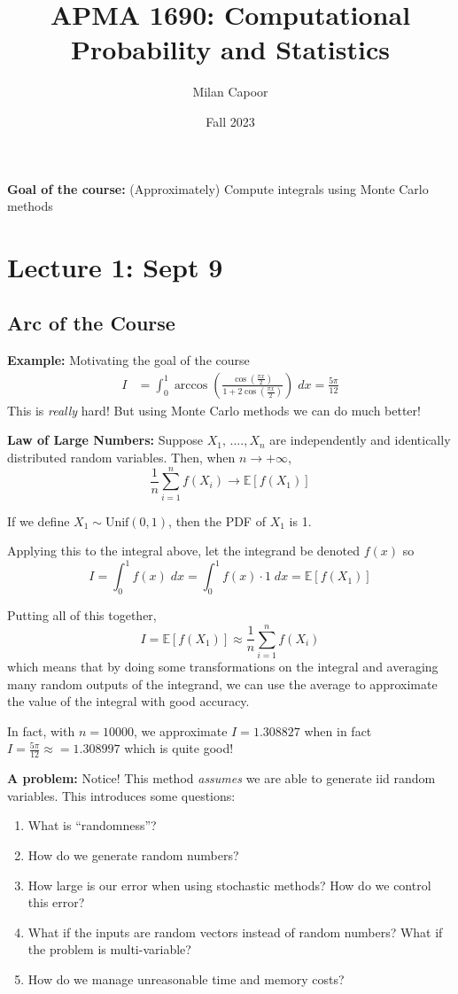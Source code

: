 \documentclass[12pt]{article}
\title{APMA 1690: Computational Probability and Statistics}
\author{Milan Capoor}
\date{Fall 2023}
\newcommand{\E}{\mathbb{E}}
\begin{document}
\maketitle
\tableofcontents

\textbf{Goal of the course:} (Approximately) Compute integrals using Monte Carlo methods

\section{Lecture 1: Sept 9}
\subsection{Arc of the Course}
\textbf{Example:} Motivating the goal of the course
\begin{align*}
    I &= \int_0^1 \arccos \left(\frac{\cos(\frac{\pi x}{2})}{1 + 2\cos(\frac{\pi x}{2})}\right)\; dx = \frac{5\pi}{12}
\end{align*}
This is \emph{really} hard! But using Monte Carlo methods we can do much better!

\textbf{Law of Large Numbers:} Suppose $X_1, \, ...., X_n$ are independently and identically distributed random variables. Then, when $n \to +\infty$,
\[\frac{1}{n}\sum_{i=1}^n f(X_i) \to \E [f(X_1)]\]

If we define $X_1 \sim \text{Unif}(0, 1)$, then the PDF of $X_1$ is 1. 

Applying this to the integral above, let the integrand be denoted $f(x)$ so 
\[I = \int_0^1 f(x)\; dx = \int_0^1 f(x) \cdot 1 \; dx = \E [f(X_1)]\]

Putting all of this together, 
\[I = \E[f(X_1)] \approx \frac{1}{n} \sum_{i=1}^n f(X_i)\]
which means that by doing some transformations on the integral and averaging many random outputs of the integrand, we can use the average to approximate the value of the integral with good accuracy. 

In fact, with $n=10000$, we approximate $I = 1.308827$ when in fact $I = \frac{5\pi}{12} \approx = 1.308997$ which is quite good!

\textbf{A problem:} Notice! This method \emph{assumes} we are able to generate iid random variables. This introduces some questions:
\begin{enumerate}
    \item What is ``randomness''?
    \item How do we generate random numbers?
    \item How large is our error when using stochastic methods? How do we control this error?
    \item What if the inputs are random vectors instead of random numbers? What if the problem is multi-variable?
    \item How do we manage unreasonable time and memory costs?
\end{enumerate}
\end{document}
